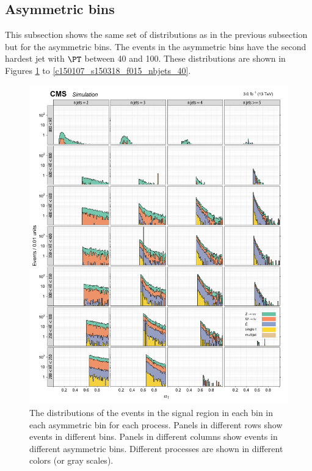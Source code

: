 \subsection{Asymmetric \njet bins}

This subsection shows the same set of distributions as in the previous
subsection but for the asymmetric \njet bins. The events in the
asymmetric \njet bins have the second hardest jet with $\PT$ between 40
and 100\gev. These distributions are shown in Figures
\ref{c150107_s150318_f015_alphaT_40} to
\ref{c150107_s150318_f015_nbjets_40}.

\begin{figure}[!h]
\centering
\includegraphics[scale=0.95]{figures/kiplots/c150107_s150318_f015_alphaT_40}
\caption{The \alphat distributions of the events in the signal region
in each \scalht bin in each asymmetric \njet bin for each process.
Panels in different rows show events in different \scalht bins. Panels
in different columns show events in different asymmetric \njet bins.
Different processes are shown in different colors (or gray scales).}
\label{c150107_s150318_f015_alphaT_40}
\end{figure}

